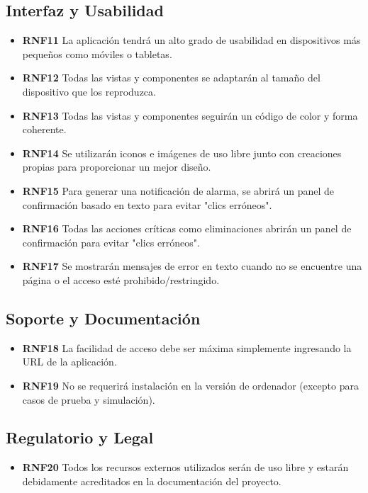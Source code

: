 \subsection{Interfaz y Usabilidad}
\begin{itemize}
    \item \textbf{RNF11} La aplicación tendrá un alto grado de usabilidad en dispositivos más pequeños como móviles o tabletas.
    \item \textbf{RNF12} Todas las vistas y componentes se adaptarán al tamaño del dispositivo que los reproduzca.
    \item \textbf{RNF13} Todas las vistas y componentes seguirán un código de color y forma coherente.
    \item \textbf{RNF14} Se utilizarán iconos e imágenes de uso libre junto con creaciones propias para proporcionar un mejor diseño.
    \item \textbf{RNF15} Para generar una notificación de alarma, se abrirá un panel de confirmación basado en texto para evitar "clics erróneos".
    \item \textbf{RNF16} Todas las acciones críticas como eliminaciones abrirán un panel de confirmación para evitar "clics erróneos".
    \item \textbf{RNF17} Se mostrarán mensajes de error en texto cuando no se encuentre una página o el acceso esté prohibido/restringido.
\end{itemize}

\subsection{Soporte y Documentación}
\begin{itemize}
    \item \textbf{RNF18} La facilidad de acceso debe ser máxima simplemente ingresando la URL de la aplicación.
    \item \textbf{RNF19} No se requerirá instalación en la versión de ordenador (excepto para casos de prueba y simulación).
\end{itemize}

\subsection{Regulatorio y Legal}
\begin{itemize}
    \item \textbf{RNF20} Todos los recursos externos utilizados serán de uso libre y estarán debidamente acreditados en la documentación del proyecto.
\end{itemize}

